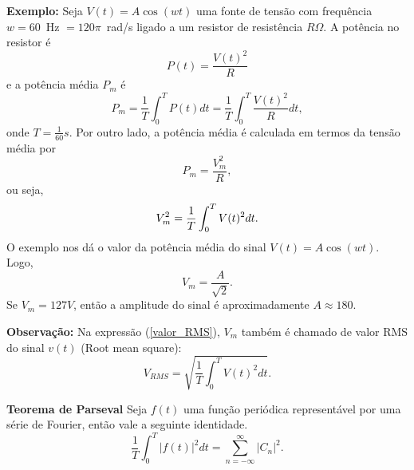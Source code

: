 \documentclass[a4paper,10pt]{book}
\begin{document}
{\bf Exemplo:} Seja $V(t)=A\cos(wt)$ uma fonte de tensão com frequência $w=60$\ \!\!Hz $=120\pi$\ \!\!rad/s ligado a um resistor de resistência $R\Omega$. A potência no resistor é
 \begin{equation}
 P(t)=\frac{V(t)^2}{R}
 \end{equation}
 e a potência média $P_m$ é
 \begin{equation}
 P_m=\frac{1}{T}\int_0^TP(t)dt=\frac{1}{T}\int_0^T\frac{V(t)^2}{R}dt,
 \end{equation}
 onde $T=\frac{1}{60}s$. Por outro lado, a potência média é calculada em termos da tensão média por
 \begin{equation}
 P_m=\frac{V_m^2}{R},
 \end{equation}
 ou seja,
 \begin{equation}{\label{valor_RMS}}
 V_m^2=\frac{1}{T}\int_0^T V(t)^2 dt.
 \end{equation}
 O exemplo  nos dá o valor da potência média do sinal $V(t)=A\cos(wt)$. Logo,
 \begin{equation}
 V_m=\frac{A}{\sqrt{2}}.
 \end{equation}
 Se $V_m=127V$, então a amplitude do sinal é aproximadamente $A\approx 180$.

 
{\bf Observação:}
Na expressão (\ref{valor_RMS}), $V_m$ também é chamado de valor RMS do sinal $v(t)$ (Root mean square):
 \begin{equation}
 V_{RMS}=\sqrt{\frac{1}{T}\int_0^T V(t)^2 dt}.
 \end{equation}

 {\bf Teorema de Parseval} Seja $f(t)$ uma função periódica representável por uma série de Fourier, então vale a seguinte identidade.
 \begin{equation}\label{teo_parseval} 
 \frac{1}{T}\int_0^T |f(t)|^2dt=\sum_{n=-\infty}^\infty |C_n|^2.
  \end{equation}
\end{document}
